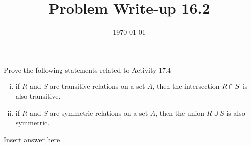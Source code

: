 \documentclass[12pt,a4paper]{article}
\title{Problem Write-up 16.2}
\date{\today}
\begin{document}
    \begin{problem}
        Prove the following statements related to Activity 17.4
        \begin{enumerate}[i.]
        \item if \(R\) and \(S\) are transitive relations on a set \(A\), then the intersection \(R \cap S\) is also transitive.
        \item if \(R\) and \(S\) are symmetric relations on a set \(A\), then the union \(R \cup S\) is also symmetric.
        \end{enumerate}
    \end{problem}
    
    \begin{answer}
        Insert answer here
    \end{answer}
\end{document}
